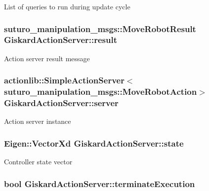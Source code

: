 List of queries to run during update cycle \hypertarget{classGiskardActionServer_a62a22a3a61a61b36a2b4c0d5f6ed1e70}{
\subsubsection[{result}]{\setlength{\rightskip}{0pt plus 5cm}suturo\-\_\-manipulation\-\_\-msgs\-::\-Move\-Robot\-Result Giskard\-Action\-Server\-::result\hspace{0.3cm}{\ttfamily [private]}}}\label{classGiskardActionServer_a62a22a3a61a61b36a2b4c0d5f6ed1e70}
Action server result message \hypertarget{classGiskardActionServer_aec1639ae446055aff03685e3a3b0bda2}{
\subsubsection[{server}]{\setlength{\rightskip}{0pt plus 5cm}actionlib\-::\-Simple\-Action\-Server$<$suturo\-\_\-manipulation\-\_\-msgs\-::\-Move\-Robot\-Action$>$ Giskard\-Action\-Server\-::server\hspace{0.3cm}{\ttfamily [protected]}}}\label{classGiskardActionServer_aec1639ae446055aff03685e3a3b0bda2}
Action server instance \hypertarget{classGiskardActionServer_ae79dc838a2d884755866e29d9c02dd77}{
\subsubsection[{state}]{\setlength{\rightskip}{0pt plus 5cm}Eigen\-::\-Vector\-Xd Giskard\-Action\-Server\-::state\hspace{0.3cm}{\ttfamily [protected]}}}\label{classGiskardActionServer_ae79dc838a2d884755866e29d9c02dd77}
Controller state vector \hypertarget{classGiskardActionServer_acc7002280c576e183f1fc07a7450918e}{
\subsubsection[{terminate\-Execution}]{\setlength{\rightskip}{0pt plus 5cm}bool Giskard\-Action\-Server\-::terminate\-Execution\hspace{0.3cm}{\ttfamily [protected]}}}\label{classGiskardActionServer_acc7002280c576e183f1fc07a7450918e}

